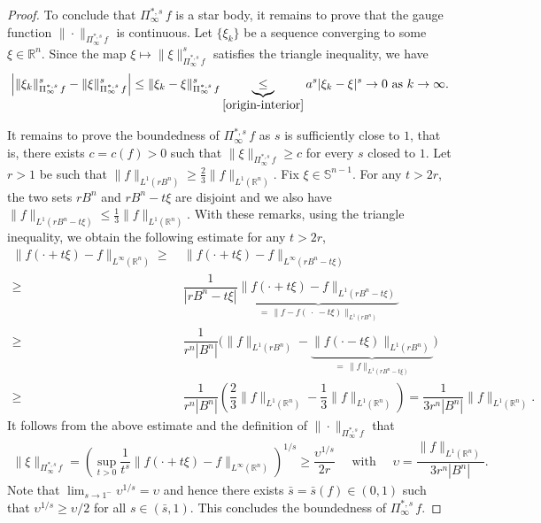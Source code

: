 \documentclass[10pt,a4paper]{amsart}
\newcommand{\R}{\mathbb{R}}
\newcommand{\Sphere}{\mathbb{S}^{n - 1}}
\begin{document}
\begin{proof}
    \medskip
    
	To conclude that $\Pi^{\ast, s}_\infty \, f$ is a star body, it remains to prove that the gauge function $\| \cdot \|_{\Pi^{\ast, s}_\infty \, f}$ is continuous.
	Let $\{ \xi_k \}$ be a sequence converging to some $\xi \in \R^n$. 
 	Since the map $\xi \mapsto \| \xi \|_{\Pi^{\ast, s}_\infty \, f}^s$ satisfies the triangle inequality, we have
    \begin{align*}
        \Big\vert \| \xi_k \|_{\Pi^{\ast, s}_\infty \, f}^s - \| \xi \|_{\Pi^{\ast, s}_\infty \, f}^s \Big\vert
        \leq 
        \| \xi_k - \xi \|_{\Pi^{\ast, s}_\infty \, f}^s \underbrace{\, \leq \,}_{\eqref{origin-interior}} a^s | \xi_k - \xi|^s \to 0 \text{ as } k \to \infty.
    \end{align*}

    \medskip

    It remains to prove the boundedness of $\Pi^{\ast, s}_\infty \, f$ as $s$ is sufficiently close to $1$, that is, there exists $c = c(f) > 0$ such that $\| \xi \|_{\Pi^{\ast, s}_\infty \, f} \geq c$ for every $s$ closed to $1$.
    Let $r > 1$ be such that $\| f \|_{L^1(r B^n)} \geq \textstyle\frac{2}{3} \| f \|_{L^1(\R^n)}$.
    Fix $\xi \in \Sphere$.
    For any $t > 2r$, the two sets $rB^n$ and $rB^n - t\xi$ are disjoint and we also have $\| f \|_{L^1(rB^n - t\xi)} \leq \textstyle\frac{1}{3} \| f \|_{L^1(\R^n)}$.
    With these remarks, using the triangle inequality, we obtain the following estimate for any $t > 2r$,
    \begin{align*}
    	\| f(\cdot + t\xi) -  f\|_{L^\infty(\R^n)}
    	\geq & 
    	~ \| f(\cdot + t\xi) -  f\|_{L^\infty(rB^n - t\xi)} \\
    	\geq & 
    	~ \dfrac{1}{|rB^n - t\xi|} \underbrace{\| f(\cdot + t\xi)  - f \|_{L^1(rB^n - t\xi)} }_{\, = \, \| f - f(~\cdot~ - t \xi)\|_{L^1(rB^n)}} \\
    	\geq & 
    	~ \dfrac{1}{r^n |B^n|} \Big( \| f \|_{L^1(rB^n)} - \underbrace{\| f(\cdot - t\xi) \|_{L^1(rB^n)}}_{ \, = \, \| f \|_{L^1(rB^n - t\xi)} } \Big) 
     \\
    	\geq & 
    	~ \dfrac{1}{r^n |B^n|} \left( \dfrac{2}{3} \| f \|_{L^1(\R^n)} - \dfrac{1}{3} \| f \|_{L^1(\R^n)} \right) =  \dfrac{1}{3 r^n |B^n|} \| f \|_{L^1(\R^n)}.
    \end{align*}
    It follows from the above estimate and the definition of $\| \cdot \|_{\Pi^{\ast, s}_\infty \, f}$  that
	\begin{align*}
		\| \xi \|_{\Pi^{\ast, s}_\infty \, f} = \left( \sup_{t > 0} \dfrac{1}{t^s} \| f(\cdot + t\xi) - f \|_{L^\infty(\R^n)} \right)^{1/s} \geq \dfrac{\upsilon^{1/s}}{2r} 
		\quad \text{ with } \quad
		\upsilon = \dfrac{\| f \|_{L^1(\R^n)}}{3r^n |B^n|}.
	\end{align*}
	Note that $\textstyle\lim_{s \to 1^-} \upsilon^{1/s} = \upsilon$ and hence there exists $\bar s = \bar s(f) \in (0, 1)$ such that $\upsilon^{1/s} \geq \upsilon/2$ for all $s \in (\bar s, 1)$.
	This concludes the boundedness of $\Pi^{\ast, s}_\infty \, f$.
	

\end{proof}
\end{document}
